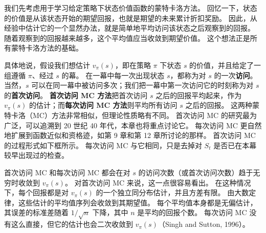 \documentclass[UTF8,12pt,a4paper,fontset=fandol]{ctexart}
\begin{document}
我们先考虑用于学习给定策略下状态价值函数的蒙特卡洛方法。
回忆一下，状态的价值是从该状态开始的期望回报，也就是期望的未来累计折扣奖励。
因此，从经验中估计它的一个显然办法，就是简单地平均访问该状态之后观察到的回报。
随着观察到的回报越来越多，这个平均值应当收敛到期望价值。
这个想法正是所有蒙特卡洛方法的基础。

具体地说，假设我们想估计 $v_\pi(s)$，即在策略 $\pi$ 下状态 $s$ 的价值，并且给定了一组遵循 $\pi$、经过 $s$ 的幕。
在一幕中每一次出现状态 $s$，都称为对 $s$ 的一次\textbf{访问}。
当然，$s$ 可以在同一幕中被访问多次；我们把一幕中第一次访问它的时刻称为对 $s$ 的\textbf{首次访问}。
\textbf{首次访问 MC 方法}把首次访问 $s$ 之后的回报平均起来，作为 $v_\pi(s)$ 的估计；而\textbf{每次访问 MC 方法}则平均所有访问 $s$ 之后的回报。
这两种蒙特卡洛（MC）方法非常相似，但理论性质略有不同。
首次访问 MC 的研究最为广泛，可以追溯到 20 世纪 40 年代，本章也将重点讨论它。
每次访问 MC 更自然地扩展到函数近似和资格迹，如第 9 章和第 12 章所讨论的那样。
首次访问 MC 的过程形式如下框所示。
每次访问 MC 与它相同，只是去掉对 $S_t$ 是否已在本幕较早出现过的检查。

\begin{center}
\end{center}

首次访问 MC 和每次访问 MC 都会在对 $s$ 的访问次数（或首次访问次数）趋于无穷时收敛到 $v_\pi(s)$。
对首次访问 MC 来说，这一点很容易看出。
在这种情况下，每个回报都是对 $v_\pi(s)$ 的一个独立同分布估计，并且方差有限。
由大数定律，这些估计的平均值序列会收敛到其期望值。
每个平均值本身都是无偏估计，其误差的标准差随着 $1/\sqrt{n}$ 下降，其中 $n$ 是平均的回报个数。
每次访问 MC 没有这么直接，但它的估计也会二次收敛到 $v_\pi(s)$（Singh and Sutton, 1996）。
\end{document}
